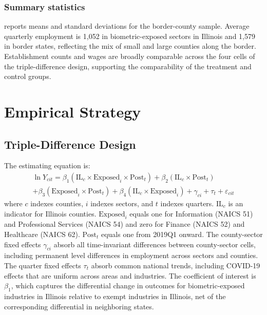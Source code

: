 \documentclass[12pt]{article}
\begin{document}
\subsubsection*{Summary statistics}  reports means and standard deviations for the border-county sample. Average quarterly employment is 1,052 in biometric-exposed sectors in Illinois and 1,579 in border states, reflecting the mix of small and large counties along the border. Establishment counts and wages are broadly comparable across the four cells of the triple-difference design, supporting the comparability of the treatment and control groups.




\section{Empirical Strategy}
\label{sec:strategy}

\subsection{Triple-Difference Design}

The estimating equation is:
\begin{multline}
\label{eq:main}
\ln Y_{cit} = \beta_1 (\text{IL}_c \times \text{Exposed}_i \times \text{Post}_t) + \beta_2 (\text{IL}_c \times \text{Post}_t) \\
+ \beta_3 (\text{Exposed}_i \times \text{Post}_t) + \beta_4 (\text{IL}_c \times \text{Exposed}_i) + \gamma_{ci} + \tau_t + \varepsilon_{cit}
\end{multline}
where $c$ indexes counties, $i$ indexes sectors, and $t$ indexes quarters. $\text{IL}_c$ is an indicator for Illinois counties. $\text{Exposed}_i$ equals one for Information (NAICS 51) and Professional Services (NAICS 54) and zero for Finance (NAICS 52) and Healthcare (NAICS 62). $\text{Post}_t$ equals one from 2019Q1 onward. The county-sector fixed effects $\gamma_{ci}$ absorb all time-invariant differences between county-sector cells, including permanent level differences in employment across sectors and counties. The quarter fixed effects $\tau_t$ absorb common national trends, including COVID-19 effects that are uniform across areas and industries. The coefficient of interest is $\beta_1$, which captures the differential change in outcomes for biometric-exposed industries in Illinois relative to exempt industries in Illinois, net of the corresponding differential in neighboring states.
\end{document}
